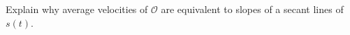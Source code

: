 {Explain why average velocities of $\mathcal{O}$ are equivalent to slopes of a secant lines of $s(t)$.}
{}